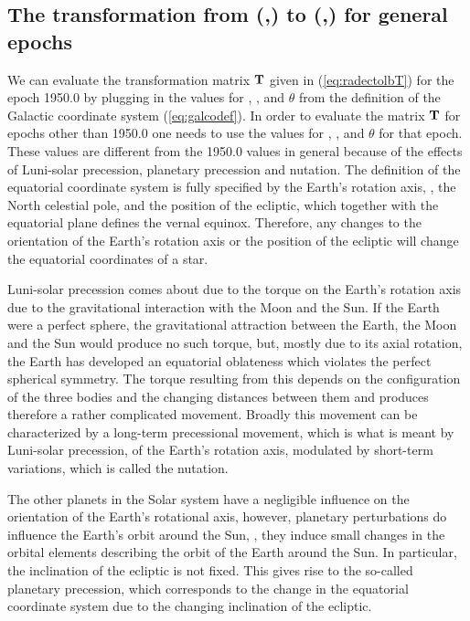 \subsection{The transformation from (\ra,\dec) to (\gall,\galb) for general epochs}

We can evaluate the transformation matrix $\mathbf{T}$ given in
(\ref{eq:radectolbT}) for the epoch 1950.0 by plugging in the values
for \rangp, \decngp, and $\theta$ from the definition of the Galactic
coordinate system (\ref{eq:galcodef}). In order to evaluate the matrix
$\mathbf{T}$ for epochs other than 1950.0 one needs to use the values for
\rangp, \decngp, and $\theta$ for that epoch. These values are
different from the 1950.0 values in general because of the effects of
Luni-solar precession, planetary precession and nutation. The
definition of the equatorial coordinate system is fully specified by
the Earth's rotation axis, \ie, the North celestial pole, and the
position of the ecliptic, which together with the equatorial plane
defines the vernal equinox. Therefore, any changes to the orientation
of the Earth's rotation axis or the position of the ecliptic will
change the equatorial coordinates of a star.

Luni-solar precession comes about due to the torque on the Earth's
rotation axis due to the gravitational interaction with the Moon and
the Sun. If the Earth were a perfect sphere, the gravitational
attraction between the Earth, the Moon and the Sun would produce no
such torque, but, mostly due to its axial rotation, the Earth has
developed an equatorial oblateness which violates the perfect
spherical symmetry. The torque resulting from this depends on the
configuration of the three bodies and the changing distances between
them and produces therefore a rather complicated movement. Broadly
this movement can be characterized by a long-term precessional
movement, which is what is meant by Luni-solar precession, of the
Earth's rotation axis, modulated by short-term variations, which is
called the nutation.

The other planets in the Solar system have a negligible influence on
the orientation of the Earth's rotational axis, however, planetary
perturbations do influence the Earth's orbit around the Sun, \ie, they
induce small changes in the orbital elements describing the orbit of
the Earth around the Sun. In particular, the inclination of the
ecliptic is not fixed. This gives rise to the so-called planetary
precession, which corresponds to the change in the equatorial
coordinate system due to the changing inclination of the ecliptic.

